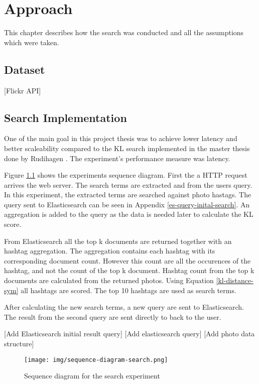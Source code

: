 \chapter{Approach}
\label{ch:approach}
This chapter describes how the search was conducted and all the assumptions which were taken.

\section{Dataset}
[Flickr API]

\section{Search Implementation}

One of the main goal in this project thesis was to achieve lower latency and better scaleability compared to the KL search implemented in the master thesis done by Rudihagen \cite{master-thesis}.
The experiment's performance measure was latency.

Figure \ref{fig:sequence-diagram-search} shows the experiments sequence diagram.
First the a HTTP request arrives the web server.
The search terms are extracted and from the users query.
In this experiment, the extracted terms are searched against photo hastags.
The query sent to Elasticsearch can be seen in Appendix \ref{es-query-inital-search}.
An aggregation is added to the query as the data is needed later to calculate the KL score.

From Elasticsearch all the top k documents are returned together with an hashtag aggregation.
The aggregation contains each hashtag with its corresponding document count.
However this count are all the occurences of the hashtag, and not the count of the top k document.
Hashtag count from the top k documents are calculated from the returned photos.
Using Equation \ref{kl-distance-sym} all hashtags are scored.
The top 10 hashtags are used as search terms.

After calculating the new search terms, a new query are sent to Elasticsearch.
The result from the second query are sent directly to back to the user.

[Add Elasticsearch initial result query]
[Add elasticsearch query]
[Add photo data structure]

\begin{figure}[h!]
\centering \texttt{[image: img/sequence-diagram-search.png]}
\caption{Sequence diagram for the search experiment}
\label{fig:sequence-diagram-search}
\end{figure}
